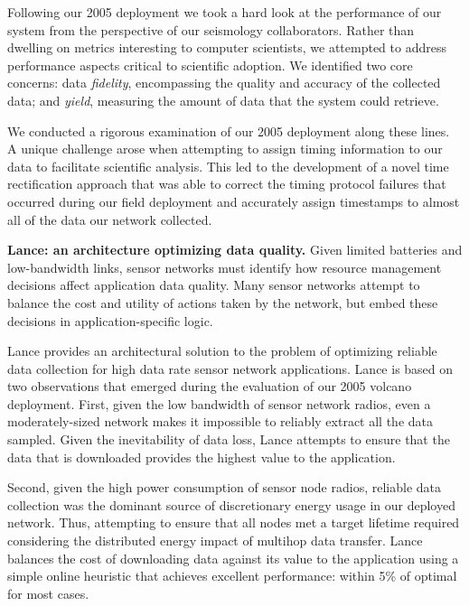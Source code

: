 Following our 2005 deployment we took a hard look at the performance of our
system from the perspective of our seismology collaborators. Rather than
dwelling on metrics interesting to computer scientists, we attempted to
address performance aspects critical to scientific adoption. We identified
two core concerns: data \textit{fidelity}, encompassing the quality and
accuracy of the collected data; and \textit{yield}, measuring the amount of
data that the system could retrieve.

We conducted a rigorous examination of our 2005 deployment along these lines.
A unique challenge arose when attempting to assign timing information to our
data to facilitate scientific analysis. This led to the development of a
novel time rectification approach that was able to correct the timing
protocol failures that occurred during our field deployment and accurately
assign timestamps to almost all of the data our network collected.

\vspace*{0.1in}

\noindent \textbf{Lance: an architecture optimizing data quality.} Given
limited batteries and low-bandwidth links, sensor networks must identify how
resource management decisions affect application data quality. Many sensor
networks attempt to balance the cost and utility of actions taken by the
network, but embed these decisions in application-specific logic.

Lance provides an architectural solution to the problem of optimizing
reliable data collection for high data rate sensor network applications.
Lance is based on two observations that emerged during the evaluation of our
2005 volcano deployment. First, given the low bandwidth of sensor network
radios, even a moderately-sized network makes it impossible to reliably
extract all the data sampled. Given the inevitability of data loss, Lance
attempts to ensure that the data that is downloaded provides the highest
value to the application.

Second, given the high power consumption of sensor node radios, reliable data
collection was the dominant source of discretionary energy usage in our
deployed network. Thus, attempting to ensure that all nodes met a target
lifetime required considering the distributed energy impact of multihop data
transfer. Lance balances the cost of downloading data against its value to
the application using a simple online heuristic that achieves excellent
performance: within 5\% of optimal for most cases.

